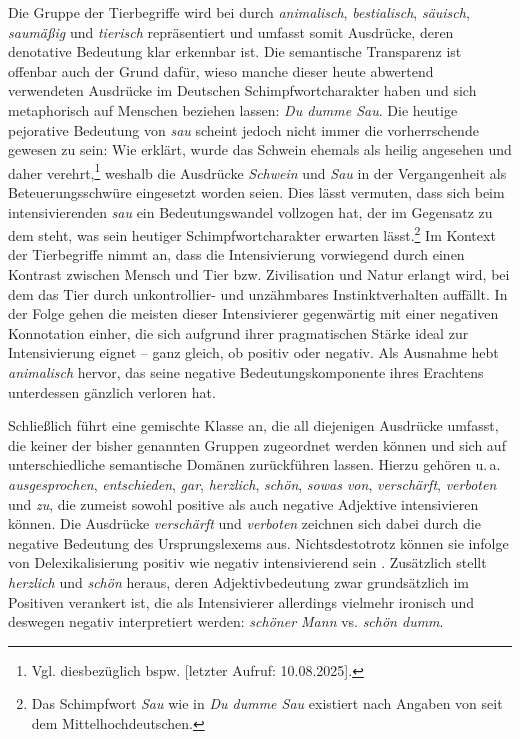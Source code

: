 Die Gruppe der Tierbegriffe wird bei \citet[360]{Claudi.2006} durch \textit{animalisch}, \textit{bestialisch}, \textit{säuisch}, \textit{saumäßig} und \textit{tierisch} repräsentiert und umfasst somit Ausdrücke, deren denotative Bedeutung klar erkennbar ist. Die semantische Transparenz ist offenbar auch der Grund dafür, wieso manche dieser heute abwertend verwendeten Ausdrücke im Deutschen Schimpfwortcharakter haben und sich metaphorisch auf Menschen beziehen lassen: \textit{Du dumme Sau}. Die heutige pejorative Bedeutung von \textit{sau} scheint jedoch nicht immer die vorherrschende gewesen zu sein: Wie {\citet[270]{Becher.1907}} erklärt, wurde das Schwein ehemals als heilig angesehen und daher verehrt,\footnote{Vgl. diesbezüglich bspw. \citet[]{Symbol.online} [letzter Aufruf: 10.08.2025].} weshalb die Ausdrücke \textit{Schwein} und \textit{Sau} in der Vergangenheit als Beteuerungsschwüre eingesetzt worden seien. Dies lässt vermuten, dass sich beim intensivierenden \textit{sau} ein Bedeutungswandel vollzogen hat, der im Gegensatz zu dem steht, was sein heutiger Schimpfwortcharakter erwarten lässt.\footnote{Das Schimpfwort \textit{Sau} wie in \textit{Du dumme Sau} existiert nach Angaben von \citet[1168]{Pfeifer.1995} seit dem Mittelhochdeutschen.} Im Kontext der Tierbegriffe nimmt \citet[360]{Claudi.2006} an, dass die Intensivierung vorwiegend durch einen Kontrast zwischen Mensch und Tier bzw. Zivilisation und Natur erlangt wird, bei dem das Tier durch unkontrollier- und unzähmbares Instinktverhalten auffällt. In der Folge gehen die meisten dieser Intensivierer gegenwärtig mit einer negativen Konnotation einher, die sich aufgrund ihrer pragmatischen Stärke ideal zur Intensivierung eignet -- ganz gleich, ob positiv oder negativ. Als Ausnahme hebt \citet[360]{Claudi.2006} \textit{animalisch} hervor, das seine negative Bedeutungskomponente ihres Erachtens unterdessen gänzlich verloren hat.


Schließlich führt \citet[360]{Claudi.2006} eine gemischte Klasse an, die all diejenigen Ausdrücke umfasst, die keiner der bisher genannten Gruppen zugeordnet werden können und sich auf unterschiedliche semantische Domänen zurückführen lassen. Hierzu gehören u.\,a. \textit{ausgesprochen}, \textit{entschieden}, \textit{gar}, \textit{herzlich}, \textit{schön}, \textit{sowas von}, \textit{verschärft}, \textit{verboten} und \textit{zu}, die zumeist sowohl positive als auch negative Adjektive intensivieren können. Die Ausdrücke \textit{verschärft} und \textit{verboten} zeichnen sich dabei durch die negative Bedeutung des Ursprungslexems aus. Nichtsdestotrotz können sie infolge von Delexikalisierung positiv wie negativ intensivierend sein \citep[vgl.][361]{Claudi.2006}. Zusätzlich stellt {\citet[361]{Claudi.2006}} \textit{herzlich} und \textit{schön} heraus, deren Adjektivbedeutung zwar grundsätzlich im Positiven verankert ist, die als Intensivierer allerdings vielmehr ironisch und deswegen negativ interpretiert werden: \textit{schöner Mann} vs. \textit{schön dumm}.

